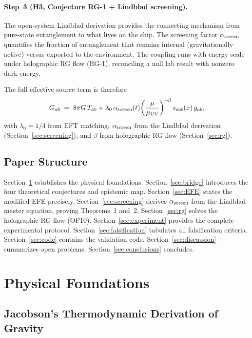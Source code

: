 \documentclass[12pt,letterpaper]{article}
\theoremstyle{definition}
\theoremstyle{remark}
\newcommand{\ascreen}{\alpha_{\rm screen}}
\newcommand{\sent}{s_{\rm ent}}
\begin{document}
\paragraph{Step~3 (H3, Conjecture RG-1 + Lindblad screening).}
The open-system Lindblad derivation provides the connecting mechanism from pure-state
entanglement to what lives on the chip.
The screening factor $\ascreen$ quantifies the fraction of entanglement that remains
internal (gravitationally active) versus exported to the environment.
The coupling runs with energy scale under holographic RG flow (RG-1),
reconciling a null lab result with nonzero dark energy.

The full effective source term is therefore
\begin{equation}
G_{ab} \;=\; 8\pi G\,T_{ab}
  + \lambda_0\,\ascreen(t)\!\left(\frac{\mu}{\mu_{\rm UV}}\right)^{-\!\beta}
    \sent(x)\,g_{ab},
\label{eq:fullsource}
\end{equation}
with $\lambda_0 = 1/4$ from EFT matching, $\ascreen$ from the Lindblad derivation
(Section~\ref{sec:screening}), and $\beta$ from holographic RG flow
(Section~\ref{sec:rg}).

\subsection{Paper Structure}

Section~\ref{sec:foundations} establishes the physical foundations.
Section~\ref{sec:bridge} introduces the four theoretical conjectures and epistemic map.
Section~\ref{sec:EFE} states the modified EFE precisely.
Section~\ref{sec:screening} derives $\ascreen$ from the Lindblad master equation,
proving Theorems~1 and~2.
Section~\ref{sec:rg} solves the holographic RG flow (OP10).
Section~\ref{sec:experiment} provides the complete experimental protocol.
Section~\ref{sec:falsification} tabulates all falsification criteria.
Section~\ref{sec:code} contains the validation code.
Section~\ref{sec:discussion} summarizes open problems.
Section~\ref{sec:conclusions} concludes.

\section{Physical Foundations}
\label{sec:foundations}

\subsection{Jacobson's Thermodynamic Derivation of Gravity}
\end{document}
